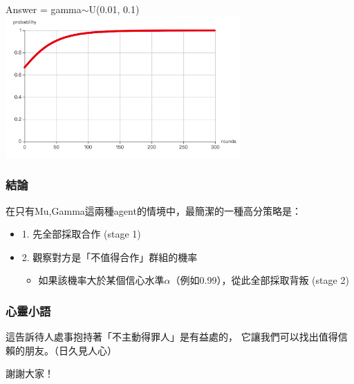\documentclass[12pt,a4paper]{beamer}
\begin{document}
\begin{CJK}{UTF8}{bsmi}
\begin{frame}
Answer = gamma$\sim$U(0.01, 0.1)
\centering\includegraphics[width=90mm,scale=0.7]{exp4-4}

\end{frame}

\begin{frame}
\frametitle{結論}

在只有Mu,Gamma這兩種agent的情境中，最簡潔的一種高分策略是：
\begin{itemize}
	\item 1. 先全部採取合作 (stage 1)
	\item 2. 觀察對方是「不值得合作」群組的機率
	\begin{itemize}
		\item 如果該機率大於某個信心水準$\alpha$（例如0.99），從此全部採取背叛 (stage 2)
	\end{itemize}
\end{itemize}

\end{frame}

\begin{frame}
\frametitle{心靈小語}

這告訴待人處事抱持著「不主動得罪人」是有益處的，  
它讓我們可以找出值得信賴的朋友。（日久見人心）

\end{frame}

\begin{frame}

\centering 謝謝大家！

\end{frame}

\end{CJK}
\end{document}
